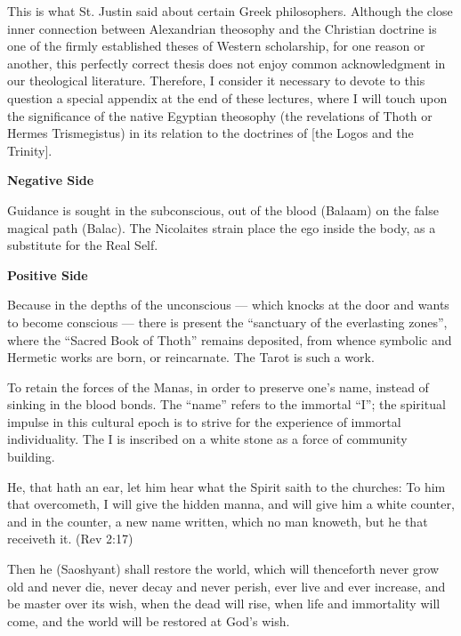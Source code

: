 \begin{quotex}
This is what St. Justin said about certain Greek philosophers. Although the close inner connection between Alexandrian theosophy and the Christian doctrine is one of the firmly established theses of Western scholarship, for one reason or another, this perfectly correct thesis does not enjoy common acknowledgment in our theological literature. Therefore, I consider it necessary to devote to this question a special appendix at the end of these lectures, where I will touch upon the significance of the native Egyptian theosophy (the revelations of Thoth or Hermes Trismegistus) in its relation to the doctrines of [the Logos and the Trinity]. 

\end{quotex}
\textbf{Negative Side}

Guidance is sought in the subconscious, out of the blood (Balaam) on the false magical path (Balac). The Nicolaites strain place the ego inside the body, as a substitute for the Real Self.

\textbf{Positive Side}

\begin{quotex}
Because in the depths of the unconscious — which knocks at the door and wants to become conscious — there is present the ``sanctuary of the everlasting zones'', where the ``Sacred Book of Thoth'' remains deposited, from whence symbolic and Hermetic works are born, or reincarnate. The Tarot is such a work. 

\end{quotex}
To retain the forces of the Manas, in order to preserve one's name, instead of sinking in the blood
bonds. The ``name'' refers to the immortal ``I''; the spiritual impulse in this cultural epoch is to strive for the experience of immortal individuality. The I is inscribed on a white stone as a force of community building.

He, that hath an ear, let him hear what the Spirit saith to the churches: To him that overcometh, I will give the hidden manna, and will give him a white counter, and in the counter, a new name written, which no man knoweth, but he that receiveth it. (Rev 2:17)

\begin{quotex}
Then he (Saoshyant) shall restore the world, which will thenceforth never grow old and never die, never decay and never perish, ever live and ever increase, and be master over its wish, when the dead will rise, when life and immortality will come, and the world will be restored at God's wish. 

\end{quotex}

